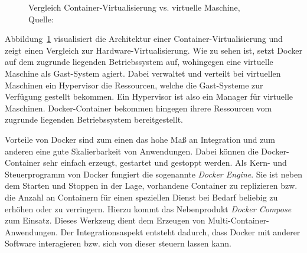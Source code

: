 \begin{figure}[h]
	\centering
	\captionsetup{justification=centering, format=plain}
	\hspace{1cm}
	\caption[Vergleich Container-Virtualisierung vs. virtuelle Maschine]{\label{fig:docker_container}Vergleich Container-Virtualisierung vs. virtuelle Maschine, \\Quelle: \cite{MS-DockerInc..05.03.2019}}
\end{figure}

Abbildung~\ref{fig:docker_container} visualisiert die Architektur einer Container-Virtualisierung und zeigt einen Vergleich zur Hardware-Virtualisierung.\autocite[Vgl.][]{MS-ChrissiKraus.27.07.2018}\autocite[Vgl.][]{MS-MicrosoftCorporation.31.08.2018}
Wie zu sehen ist, setzt Docker auf dem zugrunde liegenden Betriebssystem auf, wohingegen eine virtuelle Maschine als Gast-System agiert.
Dabei verwaltet und verteilt bei virtuellen Maschinen ein Hypervisor die Ressourcen, welche die Gast-Systeme zur Verfügung gestellt bekommen.
Ein Hypervisor ist also ein Manager für virtuelle Maschinen.\autocite[Vgl.][]{MS-ReneBust.06.04.2010}
Docker-Container bekommen hingegen ihrere Ressourcen vom zugrunde liegenden Betriebssystem bereitgestellt.

Vorteile von Docker sind zum einen das hohe Maß an Integration und zum anderen eine gute Skalierbarkeit von Anwendungen.
Dabei können die Docker-Container sehr einfach erzeugt, gestartet und gestoppt werden.
Als Kern- und Steuerprogramm von Docker fungiert die sogenannte \emph{Docker Engine}.
Sie ist neben dem Starten und Stoppen in der Lage, vorhandene Container zu replizieren bzw. die Anzahl an Containern für einen speziellen Dienst bei Bedarf beliebig zu erhöhen oder zu verringern.
Hierzu kommt das Nebenprodukt \emph{Docker Compose} zum Einsatz.
Dieses Werkzeug dient dem Erzeugen von Multi-Container-Anwendungen.
Der Integrationsaspekt entsteht dadurch, dass Docker mit anderer Software interagieren bzw. sich von dieser steuern lassen kann.\autocite[Vgl.][]{MS-Docker-Compose}
